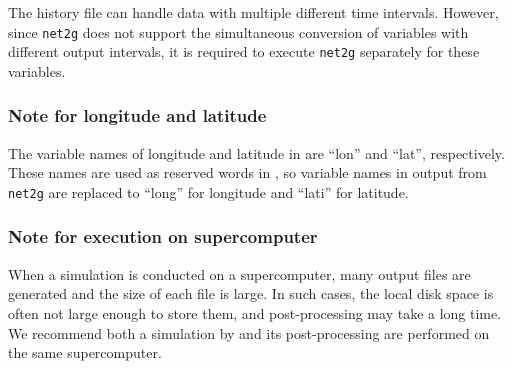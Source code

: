 The history file can handle data with multiple different time intervals.
However, since \verb|net2g| does not support the simultaneous conversion of variables with different output intervals,
it is required to execute \verb|net2g| separately for these variables.


\subsubsection{Note for longitude and latitude}
The variable names of longitude and latitude in \scalerm are ``lon'' and ``lat'', respectively.
These names are used as reserved words in \grads,
so variable names in output from \verb|net2g| are replaced to ``long'' for longitude and ``lati'' for latitude.


\subsubsection{Note for execution on supercomputer}
When a simulation is conducted on a supercomputer, many output files are generated and the size of each file is large.
In such cases, the local disk space is often not large enough to store them, and post-processing may take a long time.
We recommend both a simulation by \scalerm and its post-processing are performed on the same supercomputer.

